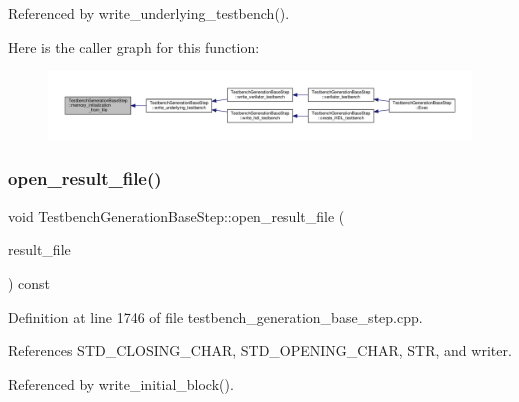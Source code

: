Referenced by write\+\_\+underlying\+\_\+testbench().

Here is the caller graph for this function\+:
\nopagebreak
\begin{figure}[H]
\begin{center}
\leavevmode
\includegraphics[width=350pt]{dc/d02/classTestbenchGenerationBaseStep_aee6bfb330acf36f11d05c4bedffa4885_icgraph}
\end{center}
\end{figure}
\mbox{\label{classTestbenchGenerationBaseStep_a4fe34404d8fb60195bcc552a79e8533a}} 
\subsubsection{\texorpdfstring{open\+\_\+result\+\_\+file()}{open\_result\_file()}}
{\footnotesize\ttfamily void Testbench\+Generation\+Base\+Step\+::open\+\_\+result\+\_\+file (\begin{DoxyParamCaption}\item[{const std\+::string \&}]{result\+\_\+file }\end{DoxyParamCaption}) const\hspace{0.3cm}{\ttfamily [protected]}}



Definition at line 1746 of file testbench\+\_\+generation\+\_\+base\+\_\+step.\+cpp.



References S\+T\+D\+\_\+\+C\+L\+O\+S\+I\+N\+G\+\_\+\+C\+H\+AR, S\+T\+D\+\_\+\+O\+P\+E\+N\+I\+N\+G\+\_\+\+C\+H\+AR, S\+TR, and writer.



Referenced by write\+\_\+initial\+\_\+block().

